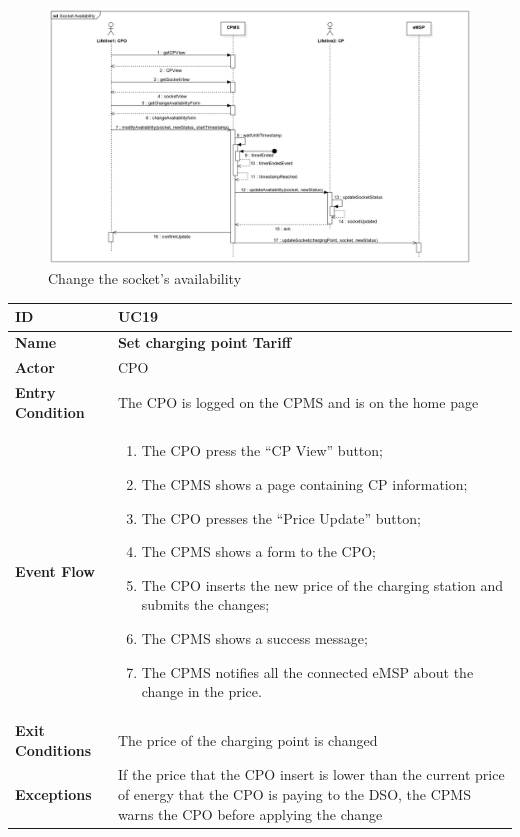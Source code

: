 \documentclass{Configuration_Files/PoliMi3i_thesis}
\begin{document}
\begin{figure}[H]
    \centering
    \includegraphics[width=1\textwidth]{Images/UseCases/ChangeSocketAvailability.jpg}
    \caption{Change the socket’s  availability}
\end{figure}


\begin{table}[H]
    \begin{xltabular}{\textwidth}{| >{}l | X |}
    \hline
    \textbf{ID} & \textbf{UC19}\T\B\\
    \hline
    \textbf{Name} & \textbf{Set charging point Tariff}\T\B\\
    \hline \hline
    \textbf{Actor} & CPO\T\B \\
    \hline
    \textbf{Entry Condition} & The CPO is logged on the CPMS and is on the home page\T\B\\
    \hline
    \textbf{Event Flow} & 
        \begin{enumerate}
        \item The CPO press the “CP View” button;
        \item The CPMS shows a page containing CP information;
        \item The CPO presses the “Price Update” button;
        \item The CPMS shows a form to the CPO;
        \item The CPO inserts the new price of the charging station and submits the changes;
        \item The CPMS shows a success message;
        \item The CPMS notifies all the connected eMSP about the change in the price.
        \end{enumerate}\B\\
    \hline
    \textbf{Exit Conditions} & The price of the charging point is changed\B\\
    \hline
    \textbf{Exceptions} & If the price that the CPO insert is lower than the current price of energy that the CPO is paying to the DSO, the CPMS warns the CPO before applying the change\B\\
    \hline
    \end{xltabular}
\end{table}
\end{document}
